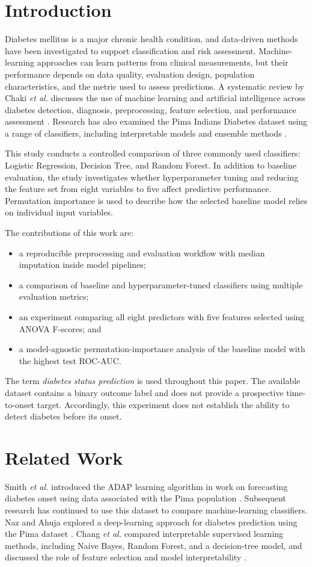 \documentclass[12pt,a4paper]{article}
\begin{document}
\section{Introduction}
Diabetes mellitus is a major chronic health condition, and data-driven methods have been investigated to support classification and risk assessment. Machine-learning approaches can learn patterns from clinical measurements, but their performance depends on data quality, evaluation design, population characteristics, and the metric used to assess predictions. A systematic review by Chaki \textit{et al.} discusses the use of machine learning and artificial intelligence across diabetes detection, diagnosis, preprocessing, feature selection, and performance assessment \cite{chaki2022}. Research has also examined the Pima Indians Diabetes dataset using a range of classifiers, including interpretable models and ensemble methods \cite{naz2020,chang2023}.

This study conducts a controlled comparison of three commonly used classifiers: Logistic Regression, Decision Tree, and Random Forest. In addition to baseline evaluation, the study investigates whether hyperparameter tuning and reducing the feature set from eight variables to five affect predictive performance. Permutation importance is used to describe how the selected baseline model relies on individual input variables.

The contributions of this work are:
\begin{itemize}
    \item a reproducible preprocessing and evaluation workflow with median imputation inside model pipelines;
    \item a comparison of baseline and hyperparameter-tuned classifiers using multiple evaluation metrics;
    \item an experiment comparing all eight predictors with five features selected using ANOVA F-scores; and
    \item a model-agnostic permutation-importance analysis of the baseline model with the highest test ROC-AUC.
\end{itemize}

The term \emph{diabetes status prediction} is used throughout this paper. The available dataset contains a binary outcome label and does not provide a prospective time-to-onset target. Accordingly, this experiment does not establish the ability to detect diabetes before its onset.

\clearpage
\section{Related Work}
Smith \textit{et al.} introduced the ADAP learning algorithm in work on forecasting diabetes onset using data associated with the Pima population \cite{smith1988}. Subsequent research has continued to use this dataset to compare machine-learning classifiers. Naz and Ahuja explored a deep-learning approach for diabetes prediction using the Pima dataset \cite{naz2020}. Chang \textit{et al.} compared interpretable supervised learning methods, including Naive Bayes, Random Forest, and a decision-tree model, and discussed the role of feature selection and model interpretability \cite{chang2023}.
\end{document}

